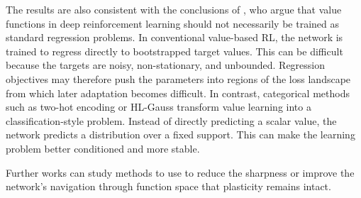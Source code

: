 The results are also consistent with the conclusions of \citep{farebrother2024stop}, who argue that value functions in deep reinforcement learning should not necessarily be trained as standard regression problems. In conventional value-based RL, the network is trained to regress directly to bootstrapped target values. This can be difficult because the targets are noisy, non-stationary, and unbounded. Regression objectives may therefore push the parameters into regions of the loss landscape from which later adaptation becomes difficult. In contrast, categorical methods such as two-hot encoding or HL-Gauss transform value learning into a classification-style problem. Instead of directly predicting a scalar value, the network predicts a distribution over a fixed support. This can make the learning problem better conditioned and more stable.

Further works can study methods to use to reduce the sharpness or improve the network’s navigation through function space that plasticity remains intact.